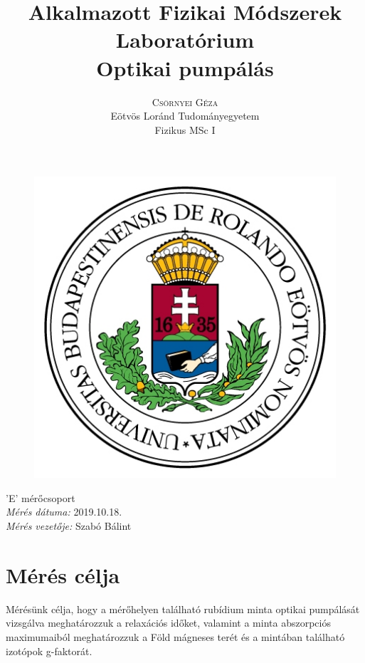 \documentclass[12pt,a4paper]{article}
\title{\huge{Alkalmazott Fizikai Módszerek Laboratórium}\\ \vspace{20pt}
\textbf{Optikai pumpálás}}
\author{\Large{\textsc{Csörnyei Géza}} \vspace{10pt}\\
	\textrm{Eötvös Loránd Tudományegyetem}\\
	\textrm{Fizikus MSc I}
	}
\date{}
\begin{document}
\addtolength{\voffset}{-1.0cm}
\addtolength{\textheight}{1.0cm}
\begin{titlepage}
\maketitle

\begin{figure}[!htb]
\centering
\includegraphics[scale=0.6]{eltecimer.jpg}
\end{figure}

\hfil \Large{'E' mérőcsoport}\hfil  \\
\vspace*{2pt}
\hfil \Large{\emph{Mérés dátuma:} 2019.10.18.}\hfil \\
\vspace*{2pt}
\hfil \hspace*{45pt} \Large{\emph{Mérés vezetője:} Szabó Bálint}\hfil
\thispagestyle{empty}
\end{titlepage}

\section{Mérés célja}
\hspace*{10pt} Mérésünk célja, hogy a mérőhelyen található rubídium minta optikai pumpálását vizsgálva meghatározzuk a relaxációs időket, valamint a minta abszorpciós maximumaiból meghatározzuk a Föld mágneses terét és a mintában található izotópok g-faktorát.
\end{document}
